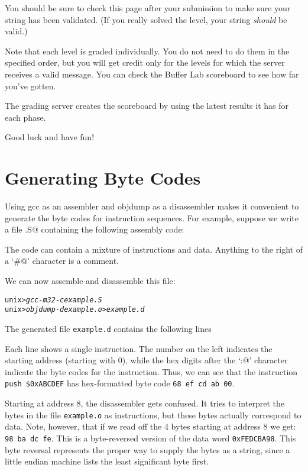 \documentclass[11pt]{article}
\newenvironment{ccode}%
{\small}%
{}
\newenvironment{tty}%
{\small\begin{alltt}}%
{\end{alltt}}
\begin{document}
You should be sure to check this page after your submission to
make sure your string has been validated. (If you really solved the
level, your string {\em should} be valid.)

Note that each level is graded individually.  You do not need to do
them in the specified order, but you will get credit only for the
levels for which the server receives a valid message. You can check
the Buffer Lab scoreboard to see how far you've gotten. 

The grading server creates the scoreboard by using the latest results
it has for each phase. 

Good luck and have fun!

\section*{Generating Byte Codes}

Using {\sc gcc} as an assembler and {\sc objdump} as a disassembler
makes it convenient to generate the byte codes for instruction
sequences.  For example, suppose we write a file \verb@example.S@
containing the following assembly code:
\begin{tty}

\end{tty}

The code can contain a mixture of instructions and data.  Anything to
the right of a `\verb@#@' character is a comment.  

We can now assemble and disassemble this file:
\begin{tty}
    unix>{\em gcc -m32 -c example.S}
    unix>{\em objdump -d example.o > example.d}
\end{tty}
The generated file {\tt example.d} contains the following lines
\begin{ccode}
    
\end{ccode}
Each line shows a single instruction.  The number on the left
indicates the starting address (starting with 0), while the hex digits
after the `\verb@:@' character indicate the byte codes for the
instruction.  Thus, we can see that the instruction {\tt push
\$0xABCDEF} has hex-formatted byte code {\tt 68 ef cd ab 00}.

Starting at address 8, the disassembler gets confused.  It tries to
interpret the bytes in the file {\tt example.o} as instructions, but
these bytes actually correspond to data.  Note, however, that if we
read off the 4 bytes starting at address 8 we get: {\tt 98 ba dc fe}.
This is a byte-reversed version of the data word {\tt 0xFEDCBA98}.
This byte reversal represents the proper way to supply the bytes as a
string, since a little endian machine lists the least significant byte
first.  
\end{document}
